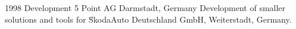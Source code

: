 \cventry
{1998}
{Development}
{}
{5 Point AG}
{Darmstadt, Germany}
{
  Development of smaller solutions and tools for \u SkodaAuto Deutschland GmbH,
  Weiterstadt, Germany.
}
